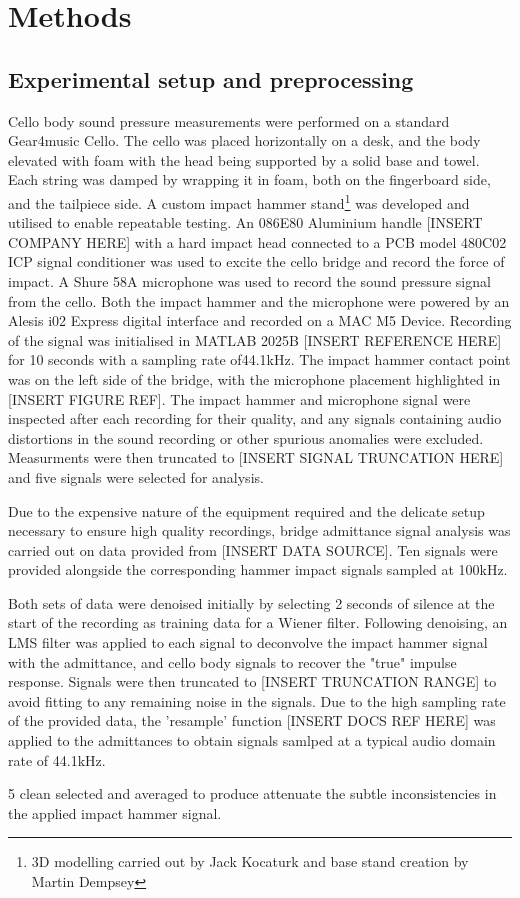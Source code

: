 \section{Methods}
\label{methods}

\subsection{Experimental setup and preprocessing}
\label{sec:experimental-setup}
Cello body sound pressure measurements were performed on a standard Gear4music Cello. The cello was 
placed horizontally on a desk, and the body elevated with foam with the head being supported by a solid base and towel. Each string was damped by wrapping it in foam, both on the fingerboard side, and the tailpiece side. A custom impact hammer stand\thanks{3D modelling carried out by Jack Kocaturk and base stand creation by Martin Dempsey} was developed and utilised to enable repeatable testing. An 086E80 Aluminium handle [INSERT COMPANY HERE] with a hard impact head connected to a PCB model 480C02 ICP signal conditioner was used to excite the cello bridge and record the force of impact. A Shure 58A microphone was used to record the sound pressure signal from the cello. Both the impact hammer and the microphone were powered by an Alesis i02 Express digital interface and recorded on a MAC M5 Device. Recording of the signal was initialised in MATLAB 2025B [INSERT REFERENCE HERE] for 10 seconds with a sampling rate of44.1kHz.
The impact hammer contact point was on the left side of the bridge, with the microphone placement highlighted in [INSERT FIGURE REF].
The impact hammer and microphone signal were inspected after each recording for their quality, and any signals containing audio distortions in the sound recording or other spurious anomalies were excluded. Measurments were then truncated to [INSERT SIGNAL TRUNCATION HERE] and five signals were selected for analysis.

Due to the expensive nature of the equipment required and the delicate setup necessary to ensure high quality recordings, bridge admittance signal analysis was carried out on data provided from [INSERT DATA SOURCE]. Ten signals were provided alongside the corresponding hammer impact signals sampled at 100kHz.

Both sets of data were denoised initially by selecting 2 seconds of silence at the start of the recording as training data for a Wiener filter. Following denoising, an LMS filter was applied to each signal to deconvolve the impact hammer signal with the admittance, and cello body signals to recover the "true" impulse response. Signals were then truncated to [INSERT TRUNCATION RANGE] to avoid fitting to any remaining noise in the signals. Due to the high sampling rate of the provided data, the 'resample' function [INSERT DOCS REF HERE] was applied to the admittances to obtain signals samlped at a typical audio domain rate of 44.1kHz.

5 clean selected and averaged to produce attenuate the subtle inconsistencies in the applied impact hammer signal.


